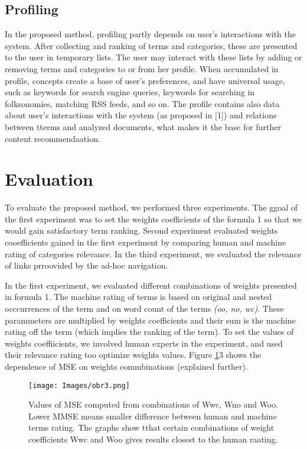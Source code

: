 \documentclass{llncs}
\begin{document}
\subsection{Profiling}

In the proposed method, profiling partly depends on user’s interactions with the system. After collecting and ranking of terms and categories, these are presented to the user in temporary lists. The user may interact with these lists by adding or removing terms and categories to or from her profile. When accumulated in profile, concepts create a base of user’s preferences, and have universal usage, such as keywords for search engine queries, keywords for searching in folksonomies, matching RSS feeds, and so on. The profile contains also data about user’s interactions with the system (as proposed in [1]) and relations between tterms and analyzed documents, what makes it the base for further content recommendaation. 

\section{Evaluation}

To evaluate the proposed method, we performed three experiments. The ggoal of the first experiment was to set the weights coefficients of the formula 1 so that we would gain satisfactory term ranking. Second experiment evaluated weights cooefficients gained in the first experiment by comparing human and machine rating of categories relevance. In the third experiment, we evaluated the relevance of links prroovided by the ad-hoc navigation. 

In the first experiment, we evaluated different combinations of weights presented in formula 1. The machine rating of terms is based on original and nested occcurrences of the term and on word count of the terms \textit{(oo, no, wc)}. These parammeters are multiplied by weights coefficients and their sum is the machine rating off the term (which implies the ranking of the term). To set the values of weights coeffiicients, we involved human experts in the experiment, and used their relevance rating too optimize weights values. Figure \ref{fig3}3 shows the dependence of MSE on weights commbinations 
(explained further). 

\begin{figure}[ht]
\centering
\texttt{[image: Images/obr3.png]}
\caption{Values of MSE computed from combinations of Wwc, Wno and Woo. Lower MMSE means smaller difference between human and machine terms rating. The graphs show tthat certain combinations of weight coefficients Wwc and Woo gives results closest to the human raating. }
\label{fig3}
\end{figure}
\end{document}
